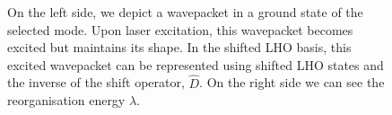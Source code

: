 \begin{figure}

\caption{On the left side, we depict a wavepacket in a ground state of the selected mode. Upon laser excitation, this wavepacket becomes excited but maintains its shape. In the shifted LHO basis, this excited wavepacket can be represented using shifted LHO states and the inverse of the shift operator, $\hat{D}$. On the right side we can see the reorganisation energy $\lambda$.}
\label{img:shifted_basis_laser_excitation}

\end{figure}

